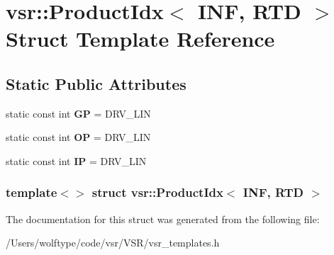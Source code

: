 \hypertarget{structvsr_1_1_product_idx_3_01_i_n_f_00_01_r_t_d_01_4}{\section{vsr\-:\-:Product\-Idx$<$ I\-N\-F, R\-T\-D $>$ Struct Template Reference}
\label{structvsr_1_1_product_idx_3_01_i_n_f_00_01_r_t_d_01_4}
}
\subsection*{Static Public Attributes}
\begin{DoxyCompactItemize}
\item 
\hypertarget{structvsr_1_1_product_idx_3_01_i_n_f_00_01_r_t_d_01_4_af8a7dcfd47d0c6321793a2784259cc48}{static const int {\bfseries G\-P} = D\-R\-V\-\_\-\-L\-I\-N}\label{structvsr_1_1_product_idx_3_01_i_n_f_00_01_r_t_d_01_4_af8a7dcfd47d0c6321793a2784259cc48}

\item 
\hypertarget{structvsr_1_1_product_idx_3_01_i_n_f_00_01_r_t_d_01_4_a2e73cbae669e09234c046470a24c4720}{static const int {\bfseries O\-P} = D\-R\-V\-\_\-\-L\-I\-N}\label{structvsr_1_1_product_idx_3_01_i_n_f_00_01_r_t_d_01_4_a2e73cbae669e09234c046470a24c4720}

\item 
\hypertarget{structvsr_1_1_product_idx_3_01_i_n_f_00_01_r_t_d_01_4_ab8a896a63cee341dc362df0e2ba92587}{static const int {\bfseries I\-P} = D\-R\-V\-\_\-\-L\-I\-N}\label{structvsr_1_1_product_idx_3_01_i_n_f_00_01_r_t_d_01_4_ab8a896a63cee341dc362df0e2ba92587}

\end{DoxyCompactItemize}
\subsubsection*{template$<$$>$ struct vsr\-::\-Product\-Idx$<$ I\-N\-F, R\-T\-D $>$}



The documentation for this struct was generated from the following file\-:\begin{DoxyCompactItemize}
\item 
/\-Users/wolftype/code/vsr/\-V\-S\-R/vsr\-\_\-templates.\-h\end{DoxyCompactItemize}

